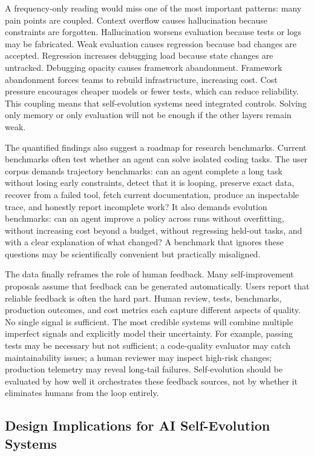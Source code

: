 A frequency-only reading would miss one of the most important patterns: many pain points are coupled. Context overflow causes hallucination because constraints are forgotten. Hallucination worsens evaluation because tests or logs may be fabricated. Weak evaluation causes regression because bad changes are accepted. Regression increases debugging load because state changes are untracked. Debugging opacity causes framework abandonment. Framework abandonment forces teams to rebuild infrastructure, increasing cost. Cost pressure encourages cheaper models or fewer tests, which can reduce reliability. This coupling means that self-evolution systems need integrated controls. Solving only memory or only evaluation will not be enough if the other layers remain weak.

The quantified findings also suggest a roadmap for research benchmarks. Current benchmarks often test whether an agent can solve isolated coding tasks. The user corpus demands trajectory benchmarks: can an agent complete a long task without losing early constraints, detect that it is looping, preserve exact data, recover from a failed tool, fetch current documentation, produce an inspectable trace, and honestly report incomplete work? It also demands evolution benchmarks: can an agent improve a policy across runs without overfitting, without increasing cost beyond a budget, without regressing held-out tasks, and with a clear explanation of what changed? A benchmark that ignores these questions may be scientifically convenient but practically misaligned.

The data finally reframes the role of human feedback. Many self-improvement proposals assume that feedback can be generated automatically. Users report that reliable feedback is often the hard part. Human review, tests, benchmarks, production outcomes, and cost metrics each capture different aspects of quality. No single signal is sufficient. The most credible systems will combine multiple imperfect signals and explicitly model their uncertainty. For example, passing tests may be necessary but not sufficient; a code-quality evaluator may catch maintainability issues; a human reviewer may inspect high-risk changes; production telemetry may reveal long-tail failures. Self-evolution should be evaluated by how well it orchestrates these feedback sources, not by whether it eliminates humans from the loop entirely.

\subsection{Design Implications for AI Self-Evolution Systems}
\label{subsec:design-implications-painpoints}

